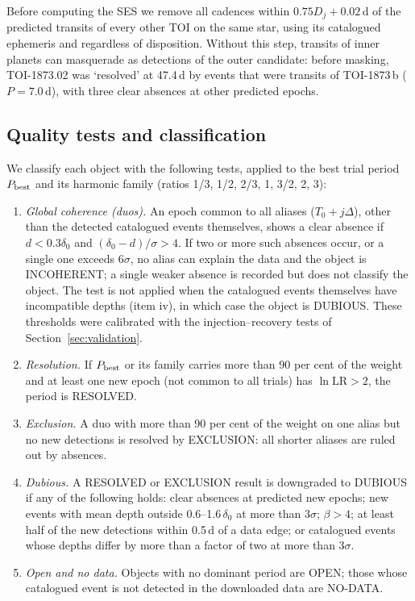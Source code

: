 \documentclass[fleqn,usenatbib]{mnras}
\begin{document}
Before computing the SES we remove all cadences within $0.75D_j + 0.02$\,d of the predicted transits of every other TOI on the same star, using its catalogued ephemeris and regardless of disposition. Without this step, transits of inner planets can masquerade as detections of the outer candidate: before masking, TOI-1873.02 was `resolved' at 47.4\,d by events that were transits of TOI-1873\,b ($P = 7.0$\,d), with three clear absences at other predicted epochs.

\subsection{Quality tests and classification}
\label{sec:tests}

We classify each object with the following tests, applied to the best trial period $P_{\rm best}$ and its harmonic family (ratios 1/3, 1/2, 2/3, 1, 3/2, 2, 3):
\begin{enumerate}
\item \textit{Global coherence (duos).} An epoch common to all aliases ($T_0 + j\Delta$), other than the detected catalogued events themselves, shows a clear absence if $d < 0.3\delta_0$ and $(\delta_0 - d)/\sigma > 4$. If two or more such absences occur, or a single one exceeds $6\sigma$, no alias can explain the data and the object is INCOHERENT; a single weaker absence is recorded but does not classify the object. The test is not applied when the catalogued events themselves have incompatible depths (item iv), in which case the object is DUBIOUS. These thresholds were calibrated with the injection--recovery tests of Section~\ref{sec:validation}.
\item \textit{Resolution.} If $P_{\rm best}$ or its family carries more than 90 per cent of the weight and at least one new epoch (not common to all trials) has $\ln\mathrm{LR} > 2$, the period is RESOLVED.
\item \textit{Exclusion.} A duo with more than 90 per cent of the weight on one alias but no new detections is resolved by EXCLUSION: all shorter aliases are ruled out by absences.
\item \textit{Dubious.} A RESOLVED or EXCLUSION result is downgraded to DUBIOUS if any of the following holds: clear absences at predicted new epochs; new events with mean depth outside 0.6--1.6\,$\delta_0$ at more than $3\sigma$; $\beta > 4$; at least half of the new detections within 0.5\,d of a data edge; or catalogued events whose depths differ by more than a factor of two at more than $3\sigma$.
\item \textit{Open and no data.} Objects with no dominant period are OPEN; those whose catalogued event is not detected in the downloaded data are NO-DATA.
\end{enumerate}
\end{document}
